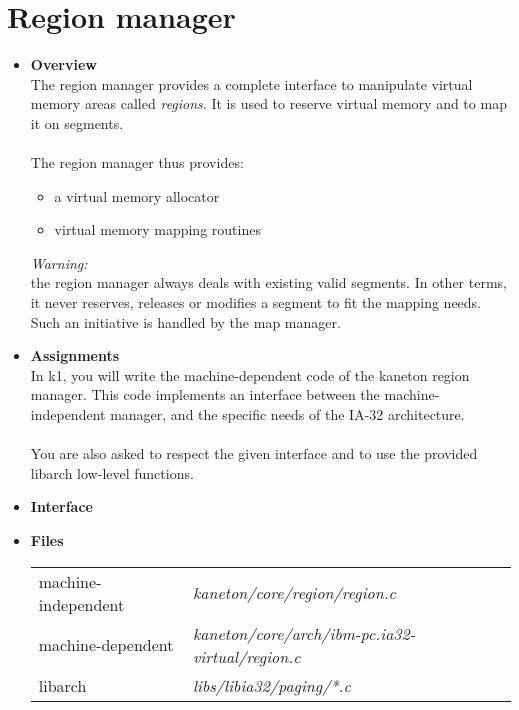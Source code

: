 \section{Region manager}
\begin{itemize}
  \item {\bf Overview}\\
    The region manager provides a complete interface to manipulate virtual memory
    areas called {\em regions}. It is used to reserve virtual memory and to map it
    on segments.\\
    \\
    The region manager thus provides:

    \begin{itemize}
      \item a virtual memory allocator
      \item virtual memory mapping routines\\
    \end{itemize}

    {\em Warning:}\\
    the region manager always deals with existing valid segments. In
    other terms, it never reserves, releases or modifies a segment to fit the mapping
    needs. Such an initiative is handled by the map manager.\\

  \item {\bf Assignments}\\
    In k1, you will write the machine-dependent code of the kaneton region manager.
    This code implements an interface between the machine-independent manager, and
    the specific needs of the IA-32 architecture.\\
    \\
    You are also asked to respect the given interface and to use the provided
    libarch low-level functions.\\

  \item {\bf Interface}\\


  \item {\bf Files}\\

    \begin{tabular}{| l | l |}
      \hline
      machine-independent & {\em kaneton/core/region/region.c}\\
      machine-dependent & {\em kaneton/core/arch/ibm-pc.ia32-virtual/region.c}\\
      libarch & {\em libs/libia32/paging/*.c}\\\hline
    \end{tabular}

\end{itemize}


